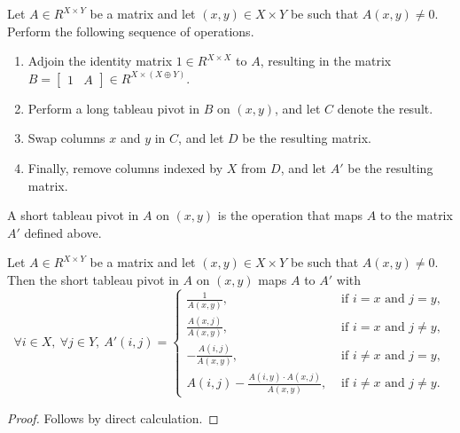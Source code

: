 \begin{definition}
    \label{Matrix.shortTableauPivot}
    \leanok
    Let $A \in R^{X \times Y}$ be a matrix and let $(x, y) \in X \times Y$ be such that $A (x, y) \neq 0$. Perform the following sequence of operations.
    \begin{enumerate}
        \item Adjoin the identity matrix $1 \in R^{X \times X}$ to $A$, resulting in the matrix $B = \begin{bmatrix} 1 & A \end{bmatrix} \in R^{X \times (X \oplus Y)}$.
        \item Perform a long tableau pivot in $B$ on $(x, y)$, and let $C$ denote the result.
        \item Swap columns $x$ and $y$ in $C$, and let $D$ be the resulting matrix.
        \item Finally, remove columns indexed by $X$ from $D$, and let $A'$ be the resulting matrix.
    \end{enumerate}
    A short tableau pivot in $A$ on $(x, y)$ is the operation that maps $A$ to the matrix $A'$ defined above.
\end{definition}

\begin{lemma}
    \label{Matrix.shortTableauPivot_eq}
    \leanok
    Let $A \in R^{X \times Y}$ be a matrix and let $(x, y) \in X \times Y$ be such that $A (x, y) \neq 0$. Then the short tableau pivot in $A$ on $(x, y)$ maps $A$ to $A'$ with
    \[
        \forall i \in X, \ \forall j \in Y, \ A' (i, j) = \begin{cases}
            \frac{1}{A (x, y)}, & \text{ if } i = x \text{ and } j = y, \\
            \frac{A (x, j)}{A (x, y)}, & \text{ if } i = x \text{ and } j \neq y, \\
            -\frac{A (i, j)}{A (x, y)}, & \text{ if } i \neq x \text{ and } j = y, \\
            A (i, j) - \frac{A (i, y) \cdot A (x, j)}{A (x, y)}, & \text{ if } i \neq x \text{ and } j \neq y.
        \end{cases}
    \]
\end{lemma}

\begin{proof}
    \leanok
    Follows by direct calculation.
\end{proof}

